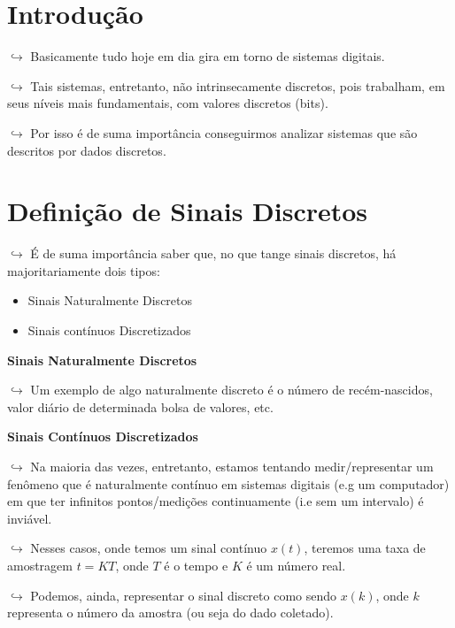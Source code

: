 \documentclass[]{article}
\providecommand{\tightlist}{%
  \setlength{\itemsep}{0pt}\setlength{\parskip}{0pt}}
\begin{document}
  \hypertarget{introduuxe7uxe3o-4}{%
  \section{Introdução}\label{introduuxe7uxe3o-4}}

  \(\hookrightarrow\) Basicamente tudo hoje em dia gira em torno de
  sistemas digitais.

  \(\hookrightarrow\) Tais sistemas, entretanto, não intrinsecamente
  discretos, pois trabalham, em seus níveis mais fundamentais, com valores
  discretos (bits).

  \(\hookrightarrow\) Por isso é de suma importância conseguirmos analizar
  sistemas que são descritos por dados discretos.

  \hypertarget{definiuxe7uxe3o-de-sinais-discretos}{%
  \section{Definição de Sinais
  Discretos}\label{definiuxe7uxe3o-de-sinais-discretos}}

  \(\hookrightarrow\) É de suma importância saber que, no que tange sinais
  discretos, há majoritariamente dois tipos:

  \begin{itemize}
  \tightlist
  \item
    Sinais Naturalmente Discretos
  \item
    Sinais contínuos Discretizados
  \end{itemize}

  \textbf{Sinais Naturalmente Discretos}

  \(\hookrightarrow\) Um exemplo de algo naturalmente discreto é o número
  de recém-nascidos, valor diário de determinada bolsa de valores, etc.

  \textbf{Sinais Contínuos Discretizados}

  \(\hookrightarrow\) Na maioria das vezes, entretanto, estamos tentando
  medir/representar um fenômeno que é naturalmente contínuo em sistemas
  digitais (e.g um computador) em que ter infinitos pontos/medições
  continuamente (i.e sem um intervalo) é inviável.

  \(\hookrightarrow\) Nesses casos, onde temos um sinal contínuo \(x(t)\),
  teremos uma taxa de amostragem \(t = KT\), onde \(T\) é o tempo e \(K\)
  é um número real.

  \(\hookrightarrow\) Podemos, ainda, representar o sinal discreto como
  sendo \(x(k)\), onde \(k\) representa o número da amostra (ou seja do
  dado coletado).
\end{document}
